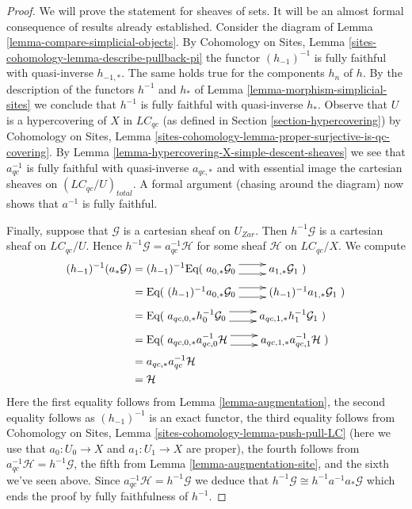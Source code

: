 \documentclass{stacks-project}
\theoremstyle{plain}
\theoremstyle{definition}
\theoremstyle{remark}
\numberwithin{equation}{subsection}
\begin{document}
\begin{proof}
We will prove the statement for sheaves of sets. It will be an
almost formal consequence of results already established.
Consider the diagram of Lemma \ref{lemma-compare-simplicial-objects}.
By Cohomology on Sites, Lemma \ref{sites-cohomology-lemma-describe-pullback-pi}
the functor $(h_{-1})^{-1}$ is fully faithful with quasi-inverse $h_{-1, *}$.
The same holds true for the components $h_n$ of $h$.
By the description of the functors $h^{-1}$ and $h_*$ of
Lemma \ref{lemma-morphism-simplicial-sites}
we conclude that $h^{-1}$ is fully faithful with quasi-inverse $h_*$.
Observe that $U$ is a hypercovering of $X$ in $\textit{LC}_{qc}$
(as defined in Section \ref{section-hypercovering}) by
Cohomology on Sites, Lemma
\ref{sites-cohomology-lemma-proper-surjective-is-qc-covering}.
By Lemma \ref{lemma-hypercovering-X-simple-descent-sheaves}
we see that $a_{qc}^{-1}$ is fully faithful with quasi-inverse $a_{qc, *}$
and with essential image the cartesian sheaves on
$(\textit{LC}_{qc}/U)_{total}$.
A formal argument (chasing around the diagram) now shows that
$a^{-1}$ is fully faithful.

\medskip\noindent
Finally, suppose that $\mathcal{G}$ is a cartesian sheaf on $U_{Zar}$.
Then $h^{-1}\mathcal{G}$ is a cartesian sheaf on $\textit{LC}_{qc}/U$.
Hence $h^{-1}\mathcal{G} = a_{qc}^{-1}\mathcal{H}$ for some sheaf
$\mathcal{H}$ on $\textit{LC}_{qc}/X$.
We compute
\begin{align*}
(h_{-1})^{-1}(a_*\mathcal{G})
& =
(h_{-1})^{-1}
\text{Eq}(
\xymatrix{
a_{0, *}\mathcal{G}_0
\ar@<1ex>[r] \ar@<-1ex>[r] &
a_{1, *}\mathcal{G}_1
}
) \\
& =
\text{Eq}(
\xymatrix{
(h_{-1})^{-1}a_{0, *}\mathcal{G}_0
\ar@<1ex>[r] \ar@<-1ex>[r] &
(h_{-1})^{-1}a_{1, *}\mathcal{G}_1
}
) \\
& =
\text{Eq}(
\xymatrix{
a_{qc, 0, *}h_0^{-1}\mathcal{G}_0
\ar@<1ex>[r] \ar@<-1ex>[r] &
a_{qc, 1, *}h_1^{-1}\mathcal{G}_1
}
) \\
& =
\text{Eq}(
\xymatrix{
a_{qc, 0, *}a_{qc, 0}^{-1}\mathcal{H}
\ar@<1ex>[r] \ar@<-1ex>[r] &
a_{qc, 1, *}a_{qc, 1}^{-1}\mathcal{H}
}
) \\
& =
a_{qc, *}a_{qc}^{-1}\mathcal{H} \\
& =
\mathcal{H}
\end{align*}
Here the first equality follows from Lemma \ref{lemma-augmentation},
the second equality follows as $(h_{-1})^{-1}$ is an exact functor,
the third equality follows from
Cohomology on Sites, Lemma \ref{sites-cohomology-lemma-push-pull-LC}
(here we use that $a_0 : U_0 \to X$ and $a_1: U_1 \to X$ are proper),
the fourth follows from $a_{qc}^{-1}\mathcal{H} = h^{-1}\mathcal{G}$,
the fifth from Lemma \ref{lemma-augmentation-site}, and the
sixth we've seen above. Since $a_{qc}^{-1}\mathcal{H} = h^{-1}\mathcal{G}$
we deduce that $h^{-1}\mathcal{G} \cong h^{-1}a^{-1}a_*\mathcal{G}$
which ends the proof by fully faithfulness of $h^{-1}$.
\end{proof}
\end{document}
